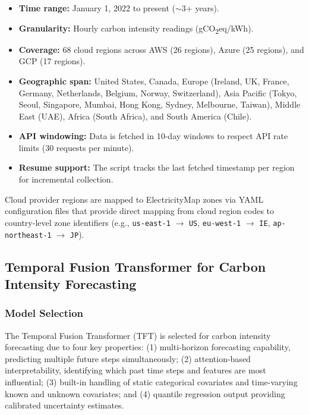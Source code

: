 \documentclass[12pt]{article}
\begin{document}
\begin{itemize}
    \item \textbf{Time range:} January 1, 2022 to present ($\sim$3+ years).
    \item \textbf{Granularity:} Hourly carbon intensity readings (gCO\textsubscript{2}eq/kWh).
    \item \textbf{Coverage:} 68 cloud regions across AWS (26 regions), Azure (25 regions), and GCP (17 regions).
    \item \textbf{Geographic span:} United States, Canada, Europe (Ireland, UK, France, Germany, Netherlands, Belgium, Norway, Switzerland), Asia Pacific (Tokyo, Seoul, Singapore, Mumbai, Hong Kong, Sydney, Melbourne, Taiwan), Middle East (UAE), Africa (South Africa), and South America (Chile).
    \item \textbf{API windowing:} Data is fetched in 10-day windows to respect API rate limits (30 requests per minute).
    \item \textbf{Resume support:} The script tracks the last fetched timestamp per region for incremental collection.
\end{itemize}

Cloud provider regions are mapped to ElectricityMap zones via YAML configuration files that provide direct mapping from cloud region codes to country-level zone identifiers (e.g., \texttt{us-east-1} $\rightarrow$ \texttt{US}, \texttt{eu-west-1} $\rightarrow$ \texttt{IE}, \texttt{ap-northeast-1} $\rightarrow$ \texttt{JP}).

\subsection{Temporal Fusion Transformer for Carbon Intensity Forecasting}

\subsubsection{Model Selection}

The Temporal Fusion Transformer (TFT) \citep{b15} is selected for carbon intensity forecasting due to four key properties: (1) multi-horizon forecasting capability, predicting multiple future steps simultaneously; (2) attention-based interpretability, identifying which past time steps and features are most influential; (3) built-in handling of static categorical covariates and time-varying known and unknown covariates; and (4) quantile regression output providing calibrated uncertainty estimates.
\end{document}
